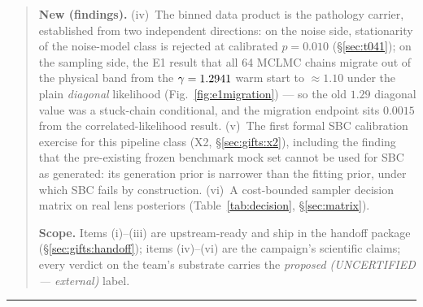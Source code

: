 \begin{minipage}{\linewidth}
\begin{quote}
\textbf{New (findings).} (iv)~The binned data product is the pathology
carrier, established from two independent directions: on the noise side,
stationarity of the noise-model class is rejected at calibrated $p=0.010$
(\S\ref{sec:t041}); on the sampling side, the E1 result that all 64 MCLMC
chains migrate out of the physical band from the $\gamma=1.2941$ warm
start to $\approx1.10$ under the plain \emph{diagonal} likelihood
(Fig.~\ref{fig:e1migration}) --- so the old $1.29$ diagonal value was a
stuck-chain conditional, and the migration endpoint sits $0.0015$ from the
correlated-likelihood result. (v)~The first formal SBC calibration
exercise for this pipeline class (X2, \S\ref{sec:gifts:x2}), including the
finding that the pre-existing frozen benchmark mock set cannot be used for
SBC as generated: its generation prior is narrower than the fitting prior,
under which SBC fails by construction. (vi)~A cost-bounded sampler
decision matrix on real lens posteriors (Table~\ref{tab:decision},
\S\ref{sec:matrix}).

\textbf{Scope.} Items (i)--(iii) are upstream-ready and ship in the
handoff package (\S\ref{sec:gifts:handoff}); items (iv)--(vi) are the
campaign's scientific claims; every verdict on the team's substrate
carries the \emph{proposed (UNCERTIFIED --- external)} label.
\end{quote}
\noindent\rule{\linewidth}{0.8pt}
\end{minipage}
